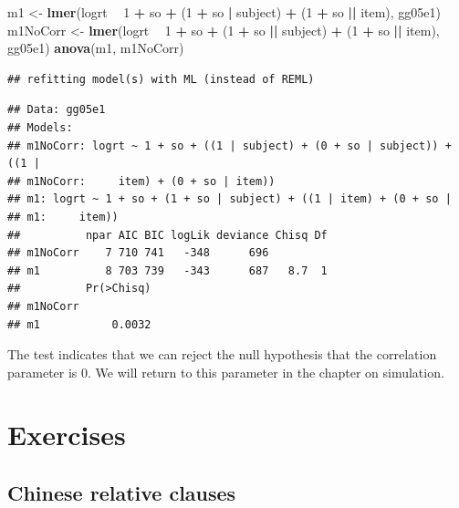 \documentclass[12pt,]{krantz}
\newenvironment{Shaded}{\begin{snugshade}}{\end{snugshade}}
\newcommand{\DecValTok}[1]{\textcolor[rgb]{0.00,0.00,0.81}{#1}}
\newcommand{\KeywordTok}[1]{\textcolor[rgb]{0.13,0.29,0.53}{\textbf{#1}}}
\newcommand{\NormalTok}[1]{#1}
\newcommand{\OperatorTok}[1]{\textcolor[rgb]{0.81,0.36,0.00}{\textbf{#1}}}
\newcommand{\StringTok}[1]{\textcolor[rgb]{0.31,0.60,0.02}{#1}}
\begin{document}
\begin{Shaded}
\begin{Highlighting}[]
\NormalTok{m1 <-}\StringTok{ }\KeywordTok{lmer}\NormalTok{(logrt }\OperatorTok{~}\StringTok{ }\DecValTok{1} \OperatorTok{+}\StringTok{ }\NormalTok{so }\OperatorTok{+}\StringTok{ }\NormalTok{(}\DecValTok{1} \OperatorTok{+}\StringTok{ }\NormalTok{so }\OperatorTok{|}\StringTok{ }\NormalTok{subject) }\OperatorTok{+}\StringTok{ }\NormalTok{(}\DecValTok{1} \OperatorTok{+}\StringTok{ }
\StringTok{  }\NormalTok{so }\OperatorTok{||}\StringTok{ }\NormalTok{item), gg05e1)}
\NormalTok{m1NoCorr <-}\StringTok{ }\KeywordTok{lmer}\NormalTok{(logrt }\OperatorTok{~}\StringTok{ }\DecValTok{1} \OperatorTok{+}\StringTok{ }\NormalTok{so }\OperatorTok{+}\StringTok{ }\NormalTok{(}\DecValTok{1} \OperatorTok{+}\StringTok{ }\NormalTok{so }\OperatorTok{||}\StringTok{ }\NormalTok{subject) }\OperatorTok{+}\StringTok{ }
\StringTok{  }\NormalTok{(}\DecValTok{1} \OperatorTok{+}\StringTok{ }\NormalTok{so }\OperatorTok{||}\StringTok{ }\NormalTok{item), gg05e1)}
\KeywordTok{anova}\NormalTok{(m1, m1NoCorr)}
\end{Highlighting}
\end{Shaded}

\begin{verbatim}
## refitting model(s) with ML (instead of REML)
\end{verbatim}

\begin{verbatim}
## Data: gg05e1
## Models:
## m1NoCorr: logrt ~ 1 + so + ((1 | subject) + (0 + so | subject)) + ((1 | 
## m1NoCorr:     item) + (0 + so | item))
## m1: logrt ~ 1 + so + (1 + so | subject) + ((1 | item) + (0 + so | 
## m1:     item))
##          npar AIC BIC logLik deviance Chisq Df
## m1NoCorr    7 710 741   -348      696         
## m1          8 703 739   -343      687   8.7  1
##          Pr(>Chisq)
## m1NoCorr           
## m1           0.0032
\end{verbatim}

The test indicates that we can reject the null hypothesis that the correlation parameter is 0. We will return to this parameter in the chapter on simulation.

\hypertarget{sec:HypTestExercises}{%
\section{Exercises}\label{sec:HypTestExercises}}

\hypertarget{sec:HypTestExercisesChinese}{%
\subsection{Chinese relative clauses}\label{sec:HypTestExercisesChinese}}
\end{document}
